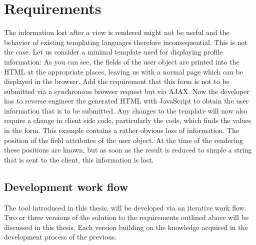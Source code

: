 \chapter{Requirements}
The information lost after a view is rendered might not be useful and
the behavior of existing templating languages therefore inconsequential.
This is not the case. Let us consider a minimal template used for
displaying profile information:
\todo{\dots}
As you can see, the fields of the user object are printed into the HTML
at the appropriate places, leaving us with a normal page which can be
displayed in the browser.
Add the requirement that this form is not to be submitted via a
synchronous browser request but via AJAX. Now the developer has to
reverse engineer the generated HTML with JavaScript to obtain the
user information that is to be submitted. Any changes to the template
will now also require a change in client side code, particularly the
code, which finds the values in the form.
This example contains a rather obvious loss of information.
The position of the field attributes of the user object.
At the time of the rendering these positions are known, but as soon as the
result is reduced to simple a string that is sent to the client, this
information is lost.


\section{Development work flow}
The tool introduced in this thesis, will be developed via an iterative
work flow. Two or three versions of the solution to the requirements outlined
above will be discussed in this thesis. Each version building on the knowledge
acquired in the development process of the previous.
